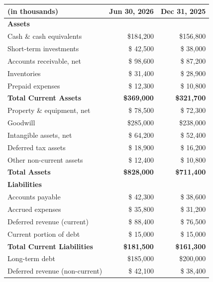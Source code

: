 \documentclass[
    language=english,
    doctype=financial-report,
    institution=none,
]{../../omnilatex}
\begin{document}
\begin{table}[h]
    \centering
    \begin{tabular}{lrr}
        \toprule
        \textbf{(in thousands)} & \textbf{Jun 30, 2026} & \textbf{Dec 31, 2025} \\
        \midrule
        \textbf{Assets} & & \\
        \quad Cash \& cash equivalents    & \$184,200 & \$156,800 \\
        \quad Short-term investments      & \$ 42,500 & \$ 38,000 \\
        \quad Accounts receivable, net    & \$ 98,600 & \$ 87,200 \\
        \quad Inventories                 & \$ 31,400 & \$ 28,900 \\
        \quad Prepaid expenses            & \$ 12,300 & \$ 10,800 \\
        \midrule
        \textbf{Total Current Assets}    & \textbf{\$369,000} & \textbf{\$321,700} \\
        \midrule
        \quad Property \& equipment, net  & \$ 78,500 & \$ 72,300 \\
        \quad Goodwill                    & \$285,000 & \$238,000 \\
        \quad Intangible assets, net      & \$ 64,200 & \$ 52,400 \\
        \quad Deferred tax assets         & \$ 18,900 & \$ 16,200 \\
        \quad Other non-current assets    & \$ 12,400 & \$ 10,800 \\
        \midrule
        \textbf{Total Assets}            & \textbf{\$828,000} & \textbf{\$711,400} \\
        \midrule
        \textbf{Liabilities} & & \\
        \quad Accounts payable            & \$ 42,300 & \$ 38,600 \\
        \quad Accrued expenses            & \$ 35,800 & \$ 31,200 \\
        \quad Deferred revenue (current)  & \$ 88,400 & \$ 76,500 \\
        \quad Current portion of debt     & \$ 15,000 & \$ 15,000 \\
        \midrule
        \textbf{Total Current Liabilities} & \textbf{\$181,500} & \textbf{\$161,300} \\
        \midrule
        \quad Long-term debt              & \$185,000 & \$200,000 \\
        \quad Deferred revenue (non-current) & \$ 42,100 & \$ 38,400 \\

\end{tabular}
\end{table}
\end{document}
